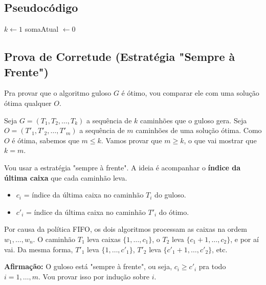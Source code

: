 \documentclass[a4paper,12pt]{article}
\begin{document}
\subsection*{Pseudocódigo}
\begin{algorithm}[H]
\SetAlgoLined
\caption{\texttt{CarregaFIFO}$(W, w[1..n])$}
\BlankLine
{}
$k \leftarrow 1$ 
somaAtual $\leftarrow 0$ 
\;
\end{algorithm}

\subsection*{Prova de Corretude (Estratégia "Sempre à Frente")}
Pra provar que o algoritmo guloso $G$ é ótimo, vou comparar ele com uma solução ótima qualquer $O$.

Seja $G = (T_1, T_2, \dots, T_k)$ a sequência de $k$ caminhões que o guloso gera.
Seja $O = (T'_1, T'_2, \dots, T'_m)$ a sequência de $m$ caminhões de uma solução ótima.
Como $O$ é ótima, sabemos que $m \le k$. Vamos provar que $m \ge k$, o que vai mostrar que $k=m$.

Vou usar a estratégia "sempre à frente". A ideia é acompanhar o \textbf{índice da última caixa} que cada caminhão leva.
\begin{itemize}
    \item $c_i$ = índice da última caixa no caminhão $T_i$ do guloso.
    \item $c'_i$ = índice da última caixa no caminhão $T'_i$ do ótimo.
\end{itemize}
Por causa da política FIFO, os dois algoritmos processam as caixas na ordem $w_1, \dots, w_n$.
O caminhão $T_1$ leva caixas $\{1, \dots, c_1\}$, o $T_2$ leva $\{c_1+1, \dots, c_2\}$, e por aí vai.
Da mesma forma, $T'_1$ leva $\{1, \dots, c'_1\}$, $T'_2$ leva $\{c'_1+1, \dots, c'_2\}$, etc.

\textbf{Afirmação:} O guloso está "sempre à frente", ou seja, $c_i \ge c'_i$ pra todo $i = 1, \dots, m$.
Vou provar isso por indução sobre $i$.
\end{document}
